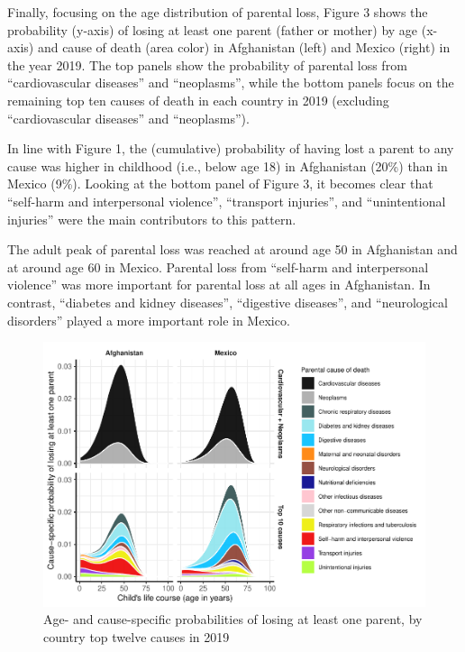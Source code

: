\documentclass[
  11pt,
  letterpaper,
]{article}
\begin{document}
Finally, focusing on the age distribution of parental loss, Figure 3 shows the probability (y-axis) of losing at least one parent (father or mother) by age (x-axis) and cause of death (area color) in Afghanistan (left) and Mexico (right) in the year 2019. The top panels show the probability of parental loss from ``cardiovascular diseases'' and ``neoplasms'', while the bottom panels focus on the remaining top ten causes of death in each country in 2019 (excluding ``cardiovascular diseases'' and ``neoplasms'').

In line with Figure 1, the (cumulative) probability of having lost a parent to any cause was higher in childhood (i.e., below age 18) in Afghanistan (20\%) than in Mexico (9\%). Looking at the bottom panel of Figure 3, it becomes clear that ``self-harm and interpersonal violence'', ``transport injuries'', and ``unintentional injuries'' were the main contributors to this pattern.

The adult peak of parental loss was reached at around age 50 in Afghanistan and at around age 60 in Mexico. Parental loss from ``self-harm and interpersonal violence'' was more important for parental loss at all ages in Afghanistan. In contrast, ``diabetes and kidney diseases'', ``digestive diseases'', and ``neurological disorders'' played a more important role in Mexico.

\begin{figure}
\centering
\includegraphics{parental_loss_global_paa_ext_abstract_files/figure-latex/ber-prob-1.pdf}
\caption{\label{fig:ber-prob}Age- and cause-specific probabilities of losing at least one parent, by country top twelve causes in 2019}
\end{figure}
\end{document}
